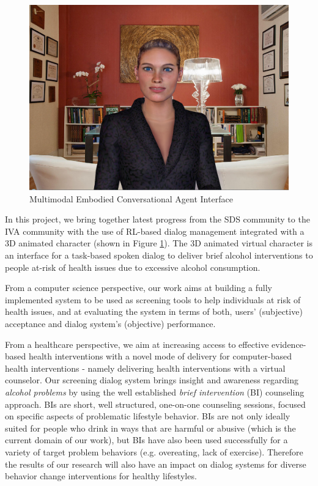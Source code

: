 \begin{sloppy}
\begin{figure}[!t]
  \centering    
 \includegraphics[width=\columnwidth]{img/lola.png}
	\caption{Multimodal Embodied Conversational Agent Interface}
  \label{lola}
\end{figure}

In this project,  we bring together latest progress from the SDS community to the IVA community with the use of RL-based dialog management integrated with a 3D animated character (shown in Figure \ref{lola}).  The 3D animated virtual character is an interface for a task-based spoken dialog to deliver brief alcohol interventions to people at-risk of health issues due to excessive alcohol consumption.  

From a computer science perspective, our work aims at building a fully implemented system to be used as screening tools to help individuals at risk of health issues, and at evaluating the system in terms of both, users' (subjective) acceptance and dialog system's (objective) performance.  

From a healthcare perspective, we aim at increasing access to effective evidence-based health interventions with a novel mode of delivery for computer-based health interventions - namely delivering health interventions with a virtual counselor.  Our screening dialog system brings insight and awareness regarding \textit{alcohol problems} by using the well established \textit{brief intervention} (BI) counseling approach.  BIs are short, well structured, one-on-one counseling sessions, focused on specific aspects of problematic lifestyle behavior.   BIs are not only ideally suited for people who drink in ways that are harmful or abusive (which is the current domain of our work), but BIs have also been used successfully for a variety of target problem behaviors (e.g. overeating, lack of exercise).  Therefore the results of our research will also have an impact on dialog systems for diverse behavior change interventions for healthy lifestyles.


\end{sloppy}
